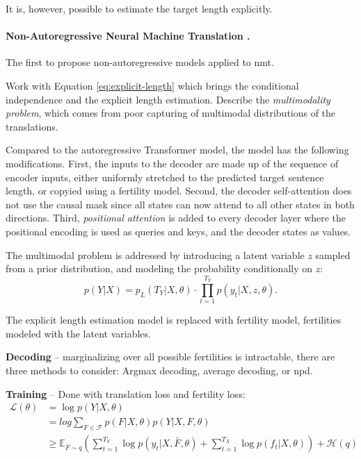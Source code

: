It is, however, possible to estimate the target length explicitly. 

\citep{ghazvininejad2019mask} \citep{mansimov2019generalized}



\paragraph{Non-Autoregressive Neural Machine Translation
  \citep{gu2017nonautoregressive}.} The first to propose non-autoregressive
models applied to \gls{nmt}.

Work with Equation \ref{eq:explicit-length} which brings the conditional
independence and the explicit length estimation. Describe the
\emph{multimodality problem}, which comes from poor capturing of multimodal
distributions of the translations.

Compared to the autoregressive Transformer model, the model has the following
modifications. First, the inputs to the decoder are made up of the sequence of
encoder inputs, either uniformly stretched to the predicted target sentence
length, or copyied using a fertility model. Second, the decoder self-attention
does not use the causal mask since all states can now attend to all other states
in both directions. Third, \emph{positional attention} is added to every decoder
layer where the positional encoding is used as queries and keys, and the decoder
states as values.

The multimodal problem is addressed by introducing a latent variable $z$ sampled
from a prior distribution, and modeling the probability conditionally on $z$:
\begin{equation}
  p(Y|X) = p_L(T_Y|X, \theta) \cdot \prod_{t=1}^{T_Y}p(y_t|X, z, \theta).
\end{equation}

The explicit length estimation model is replaced with fertility model,
fertilities modeled with the latent variables.

\textbf{Decoding} -- marginalizing over all possible fertilities is intractable,
there are three methods to consider: Argmax decoding, average decoding, or
\gls{npd}.

\textbf{Training} -- Done with translation loss and fertility loss:
\begin{align}
  \mathcal{L}(\theta)  & = \log p(Y|X, \theta) \\
                       & = log \sum_{F \in \mathcal{F}} p(F| X, \theta ) p(Y | X, F, \theta) \\
                       & \geq \mathbb{E}_{\bar{F} \sim q}
                         \left(
                         \sum_{t=1}^{T_Y} \log p(y_t | X, \bar{F}, \theta)
                         + \sum_{t=1}^{T_X} \log p(f_t | X, \theta)
                         \right)
                         + \mathcal{H}(q)
\end{align}

